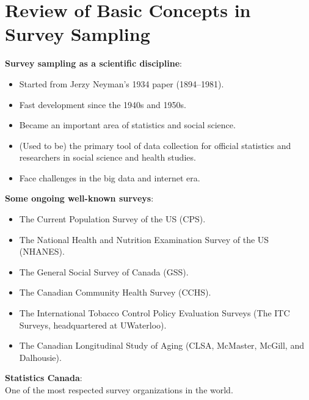 \chapter{Review of Basic Concepts in Survey Sampling}

\textbf{Survey sampling as a scientific discipline}:
\begin{itemize}
      \item Started from Jerzy Neyman's 1934 paper (1894--1981).
      \item Fast development since the 1940s and 1950s.
      \item Became an important area of statistics and social science.
      \item (Used to be) the primary tool of data collection for official
            statistics and researchers in social science and health studies.
      \item Face challenges in the big data and internet era.
\end{itemize}

\textbf{Some ongoing well-known surveys}:
\begin{itemize}
      \item The Current Population Survey of the US (CPS).
      \item The National Health and Nutrition Examination Survey of the
            US (NHANES).
      \item The General Social Survey of Canada (GSS).
      \item The Canadian Community Health Survey (CCHS).
      \item The International Tobacco Control Policy Evaluation Surveys
            (The ITC Surveys, headquartered at UWaterloo).
      \item The Canadian Longitudinal Study of Aging
            (CLSA, McMaster, McGill, and Dalhousie).
\end{itemize}

\textbf{Statistics Canada}:\\
One of the most respected survey organizations in the world.

